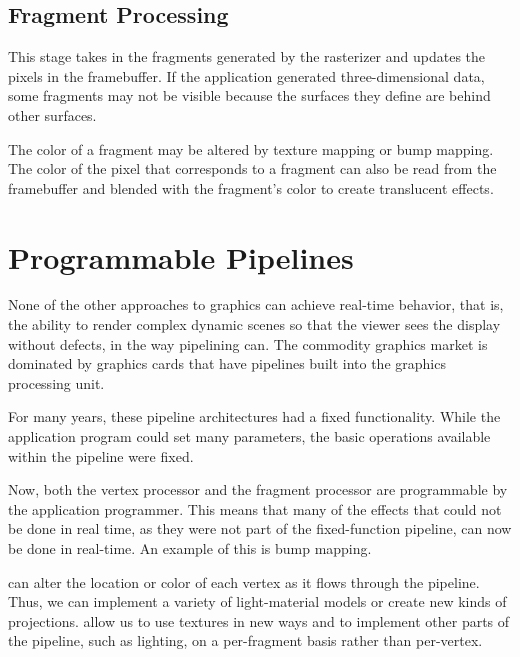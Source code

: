 \documentclass[\main/notes.tex]{subfiles}
\begin{document}
      \subsection{Fragment Processing}
        This stage takes in the fragments generated by the rasterizer
        and updates the pixels in the framebuffer.
        If the application generated three-dimensional data,
        some fragments may not be visible
        because the surfaces they define are behind other surfaces.

        The color of a fragment may be altered by texture mapping or bump mapping.
        The color of the pixel that corresponds to a fragment
        can also be read from the framebuffer
        and blended with the fragment's color
        to create translucent effects.

    \pagebreak

    \section{Programmable Pipelines}
      None of the other approaches to graphics
      can achieve real-time behavior,
      that is, the ability to render complex dynamic scenes
      so that the viewer sees the display without defects,
      in the way pipelining can.
      The commodity graphics market is dominated by graphics cards
      that have pipelines built into the graphics processing unit.

      For many years, these pipeline architectures had a fixed functionality.
      While the application program could set many parameters,
      the basic operations available within the pipeline were fixed.

      Now, both the vertex processor and the fragment processor are
      programmable by the application programmer.
      This means that many of the effects that could not be done in real time,
      as they were not part of the fixed-function pipeline,
      can now be done in real-time.
      An example of this is bump mapping.

       can alter the location or color of each vertex
      as it flows through the pipeline.
      Thus, we can implement a variety of light-material models
      or create new kinds of projections.
       allow us to use textures in new ways
      and to implement other parts of the pipeline,
      such as lighting,
      on a per-fragment basis rather than per-vertex.
\end{document}
